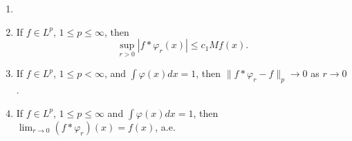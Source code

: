 
\begin{theorem}\label{thm:ch4_1.6}
\begin{enumerate}
    \item[]
    \item If $f \in L^p$, $1 \leq p \leq \infty$, then
    \[\sup_{r>0}|f * \varphi_r(x)| \leq c_1 Mf(x).\]
    \item If $f \in L^p$, $1 \leq p < \infty$, and $\int \varphi(x)dx = 1$, then $\|f * \varphi_r - f\|_p \to 0$ as $r \to 0$.
    \item If $f \in L^p$, $1 \leq p \leq \infty$ and $\int \varphi(x)dx = 1$, then $\lim_{r\to 0}(f * \varphi_r)(x) = f(x)$, a.e.
\end{enumerate}
\end{theorem}

